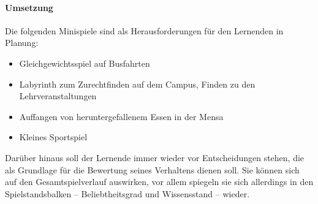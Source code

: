 \documentclass[a4paper,10pt]{article}
\begin{document}
\paragraph{Umsetzung}
	Die folgenden Minispiele sind als Herausforderungen für den Lernenden in Planung:
	\begin{itemize}
		\item Gleichgewichtsspiel auf Busfahrten
		\item Labyrinth zum Zurechtfinden auf dem Campus, Finden zu den Lehrveranstaltungen
		\item Auffangen von heruntergefallenem Essen in der Mensa
		\item Kleines Sportspiel
	\end{itemize}
	Darüber hinaus soll der Lernende immer wieder vor Entscheidungen stehen, die als Grundlage für die Bewertung seines Verhaltens dienen soll. Sie können sich auf den Gesamtspielverlauf auswirken, vor allem spiegeln sie sich allerdings in den Spielstandsbalken – Beliebtheitsgrad und Wissensstand – wieder.
\end{document}
